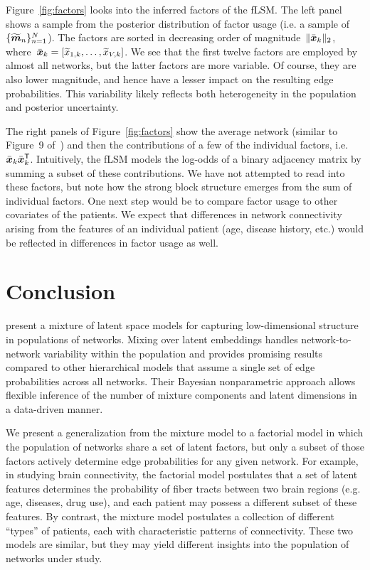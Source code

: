Figure~\ref{fig:factors} looks into the inferred factors of the fLSM.
The left panel shows a sample from the posterior distribution of factor
usage (i.e. a sample of~$\{\widetilde{\boldsymbol{m}}_n\}_{n=1}^N$). The factors
are sorted in decreasing order of magnitude~$\|\bar{\boldsymbol{x}}_k\|_2$,
where~${\bar{\boldsymbol{x}}_k = \left[ \widetilde{x}_{1,k}, \ldots, \widetilde{x}_{V,k} \right]}$.
We see that the first twelve factors are employed by almost all networks,
but the latter factors are more variable.  Of course, they are also
lower magnitude, and hence have a lesser impact on the resulting edge
probabilities.  This variability likely reflects both heterogeneity
in the population and posterior uncertainty.

The right panels of Figure~\ref{fig:factors} show the average network
(similar to Figure~9 of~\citet{durante2016nonparametric}) and then the
contributions of a few of the individual factors, i.e.~${\bar{\boldsymbol{x}}_k \bar{\boldsymbol{x}}_k^{\mathsf{T}}}$.
Intuitively, the fLSM models the log-odds of a binary adjacency matrix
by summing a subset of these contributions.  We have not attempted to
read into these factors, but note how the strong
block structure emerges from the sum of individual factors.  One
next step would be to compare factor usage to other covariates of the
patients.  We expect that differences in network connectivity
arising from the features of an individual patient (age, disease history,
etc.) would be reflected in differences in factor usage as well.

\section{Conclusion}
\citet{durante2016nonparametric} present a mixture of latent space
models for capturing low-dimensional structure in populations of
networks.  Mixing over latent embeddings handles network-to-network
variability within the population and provides promising results
compared to other hierarchical models that assume a single set of
edge probabilities across all networks.  Their Bayesian
nonparametric approach allows flexible inference of the number of
mixture components and latent dimensions in a data-driven manner.

We present a generalization from the mixture
model to a factorial model in which the population of
networks share a set of latent factors, but only a subset of those
factors actively determine edge probabilities for any given network.
For example, in studying brain connectivity, the factorial model postulates
that a set of latent features determines the probability of fiber
tracts between two brain regions (e.g. age, diseases, drug use), and
each patient may possess a different subset of these features. By contrast,
the mixture model postulates a collection of different ``types'' of
patients, each with characteristic patterns of connectivity.
These two models are similar, but they may yield different
insights into the population of networks under study.

